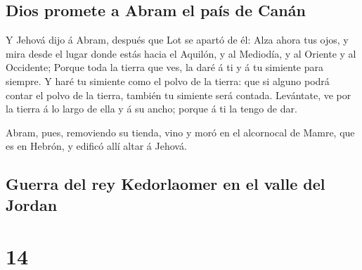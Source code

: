 \hypertarget{dios-promete-a-abram-el-pauxeds-de-canuxe1n}{%
\subsection{Dios promete a Abram el país de
Canán}\label{dios-promete-a-abram-el-pauxeds-de-canuxe1n}}

 Y Jehová dijo á Abram, después que Lot se apartó de él:
Alza ahora tus ojos, y mira desde el lugar donde estás hacia el Aquilón,
y al Mediodía, y al Oriente y al Occidente;  Porque toda
la tierra que ves, la daré á ti y á tu simiente para siempre.
 Y haré tu simiente como el polvo de la tierra: que si
alguno podrá contar el polvo de la tierra, también tu simiente será
contada.  Levántate, ve por la tierra á lo largo de ella
y á su ancho; porque á ti la tengo de dar.

 Abram, pues, removiendo su tienda, vino y moró en el
alcornocal de Mamre, que es en Hebrón, y edificó allí altar á Jehová.

\hypertarget{guerra-del-rey-kedorlaomer-en-el-valle-del-jordan}{%
\subsection{Guerra del rey Kedorlaomer en el valle del
Jordan}\label{guerra-del-rey-kedorlaomer-en-el-valle-del-jordan}}

\hypertarget{section-13}{%
\section{14}\label{section-13}}

